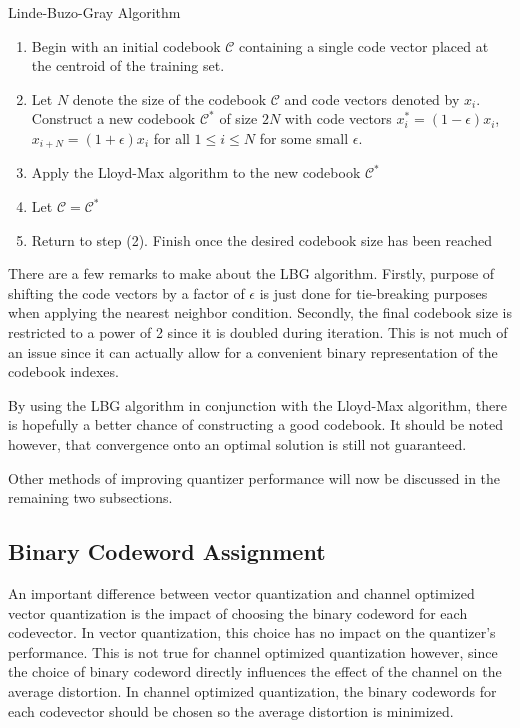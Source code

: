 \documentclass[10pt]{article}
\begin{document}
{\sc \noindent Linde-Buzo-Gray Algorithm}
\begin{enumerate}
\item Begin with an initial codebook $\mathcal{C}$ containing a single code vector placed at the centroid of the training set.
  \item Let $N$ denote the size of the codebook $\mathcal{C}$ and code vectors denoted by $x_i$. Construct a new codebook $\mathcal{C}^*$ of size $2N$ with code vectors $x_i^* = (1-\epsilon)x_i$, $x_{i+N} = (1+\epsilon)x_i$ for all $1 \le i \le N$ for some small $\epsilon$.
\item Apply the Lloyd-Max algorithm to the new codebook $\mathcal{C}^*$
\item Let $\mathcal{C}=\mathcal{C}^*$
\item Return to step (2). Finish once the desired codebook size has been reached
\end{enumerate}
There are a few remarks to make about the LBG algorithm. Firstly, purpose of shifting the code vectors by a factor of $\epsilon$ is just done for tie-breaking purposes when applying the nearest neighbor condition. Secondly, the final codebook size is restricted to a power of 2 since it is doubled during iteration. This is not much of an issue since it can actually allow for a convenient binary representation of the codebook indexes.

By using the LBG algorithm in conjunction with the Lloyd-Max algorithm, there is hopefully a better chance of constructing a good codebook. It should be noted however, that convergence onto an optimal solution is still not guaranteed.

Other methods of improving quantizer performance will now be discussed in the remaining two subsections.

\subsection{Binary Codeword Assignment}
\label{sec:code_assign}
An important difference between vector quantization and channel optimized vector quantization is the impact of choosing the binary codeword for each codevector. In vector quantization, this choice has no impact on the quantizer's performance. This is not true for channel optimized quantization however, since the choice of binary codeword directly influences the effect of the channel on the average distortion. In channel optimized quantization, the binary codewords for each codevector should be chosen so the average distortion is minimized.
\end{document}
